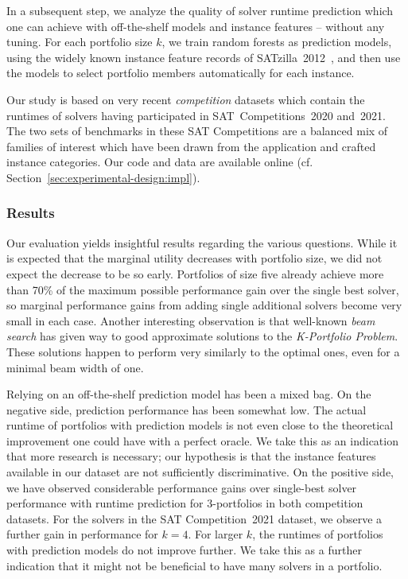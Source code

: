 \documentclass[runningheads]{llncs}
\begin{document}
In a subsequent step, we analyze the quality of solver runtime prediction which one can achieve with off-the-shelf models and instance features -- without any tuning.
For each portfolio size $k$, we train random forests as prediction models, using the widely known instance feature records of SATzilla~2012~\cite{xu2012satzilla2012}, and then use the models to select portfolio members automatically for each instance. 

Our study is based on very recent \emph{competition} datasets which contain the runtimes of solvers having participated in SAT~Competitions~2020 and~2021. 
The two sets of benchmarks in these SAT Competitions are a balanced mix of families of interest which have been drawn from the application and crafted instance categories. 
Our code and data are available online (cf. Section~\ref{sec:experimental-design:impl}).

\subsubsection{Results}

Our evaluation yields insightful results regarding the various questions. 
While it is expected that the marginal utility decreases with portfolio size, we did not expect the decrease to be so early. 
Portfolios of size five already achieve more than 70\% of the maximum possible performance gain over the single best solver, so marginal performance gains from adding single additional solvers become very small in each case. 
Another interesting observation is that well-known \emph{beam search} has given way to good approximate solutions to the \emph{K-Portfolio Problem}. 
These solutions happen to perform very similarly to the optimal ones, even for a minimal beam width of one.

Relying on an off-the-shelf prediction model has been a mixed bag. 
On the negative side, prediction performance has been somewhat low. 
The actual runtime of portfolios with prediction models is not even close to the theoretical improvement one could have with a perfect oracle.
We take this as an indication that more research is necessary; our hypothesis is that the instance features available in our dataset are not sufficiently discriminative. 
On the positive side, we have observed considerable performance gains over single-best solver performance with runtime prediction for $3$-portfolios in both competition datasets. 
For the solvers in the SAT Competition~2021 dataset, we observe a further gain in performance for $k = 4$. 
For larger $k$, the runtimes of portfolios with prediction models do not improve further. 
We take this as a further indication that it might not be beneficial to have many solvers in a portfolio. 
\end{document}
